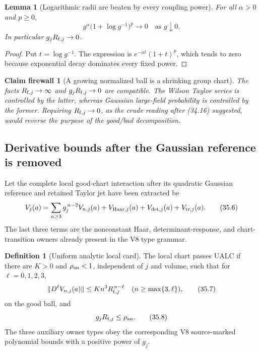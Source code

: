 \documentclass[11pt,oneside]{book}
\newtheorem{lemma}[theorem]{Lemma}
\newtheorem{firewall}[theorem]{Claim firewall}
\theoremstyle{definition}
\newtheorem{definition}[theorem]{Definition}
\theoremstyle{remark}
\begin{document}
\begin{lemma}[Logarithmic radii are beaten by every coupling power]
\label{lem:e8v35-log-beaten}
For all \(\alpha>0\) and \(p\geq0\),
\[
                g^\alpha\bigl(1+\log g^{-1}\bigr)^p
                \longrightarrow0
                \quad\text{as }g\downarrow0.                    \tag{35.5}
\]
In particular \(g_jR_{{\rm f},j}\to0\).
\end{lemma}

\begin{proof}
Put \(t=\log g^{-1}\).  The expression is
\(e^{-\alpha t}(1+t)^p\), which tends to zero because exponential
decay dominates every fixed power.
\end{proof}

\begin{firewall}[A growing normalized ball is a shrinking group chart]
\label{fire:e8v35-two-radii}
The facts \(R_{{\rm f},j}\to\infty\) and
\(g_jR_{{\rm f},j}\to0\) are compatible.  The Wilson Taylor series is
controlled by the latter, whereas Gaussian large-field probability
is controlled by the former.  Requiring \(R_{{\rm f},j}\to0\), as
the crude reading after (34.16) suggested, would reverse the purpose
of the good/bad decomposition.
\end{firewall}

\subsection{Derivative bounds after the Gaussian reference is removed}

Let the complete local good-chart interaction after its quadratic
Gaussian reference and retained Taylor jet have been extracted be
\[
 V_j(a)=\sum_{n\geq3}g_j^{\,n-2}V_{n,j}(a)+V_{{\rm Haar},j}(a)
 +V_{{\rm det},j}(a)+V_{{\rm tr},j}(a).                          \tag{35.6}
\]
The last three terms are the nonconstant Haar, determinant-response,
and chart-transition owners already present in the V8 type grammar.

\begin{definition}[Uniform analytic local card]
\label{def:e8v35-local-card}
The local chart passes UALC if there are \(K>0\) and
\(\rho_{\rm an}<1\), independent of \(j\) and volume, such that for
\(\ell=0,1,2,3\),
\[
 \|D^\ell V_{n,j}(a)\|
 \leq K n^3 R_{{\rm f},j}^{\,n-\ell}
 \quad
 (n\geq\max\{3,\ell\}),                                          \tag{35.7}
\]
on the good ball, and
\[
                         g_jR_{{\rm f},j}\leq\rho_{\rm an}.       \tag{35.8}
\]
The three auxiliary owner types obey the corresponding V8
source-marked polynomial bounds with a positive power of \(g_j\).
\end{definition}
\end{document}
